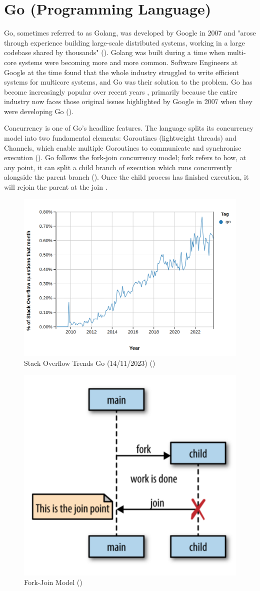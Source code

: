\section{Go (Programming Language)}
\label{litrev:golang}

Go, sometimes referred to as Golang, was developed by Google in 2007 and "arose through experience building large-scale distributed systems, working in a large codebase shared by thousands" (\cite{cox_go_2022}). Golang was built during a time when multi-core systems were becoming more and more common. Software Engineers at Google at the time found that the whole industry struggled to write efficient systems for multicore systems, and Go was their solution to the problem. Go has become increasingly popular over recent years , primarily because the entire industry now faces those original issues highlighted by Google in 2007 when they were developing Go (\cite{cox_go_2022}).

Concurrency is one of Go's headline features. The language splits its concurrency model into two fundamental elements: Goroutines (lightweight threads) and Channels, which enable multiple Goroutines to communicate and synchronise execution (\cite{meyerson_go_2014}). Go follows the fork-join concurrency model; fork refers to how, at any point, it can split a child branch of execution which runs concurrently alongside the parent branch (\cite{cox-buday_concurrency_2017}). Once the child process has finished execution, it will rejoin the parent at the join .

\begin{figure}
    \centering
    \includegraphics[width=0.8\linewidth]{figures/go-so-graph.png}
    \caption{Stack Overflow Trends Go (14/11/2023) (\cite{noauthor_stack_nodate-1})}
    \label{fig:gosograph}
\end{figure}

\begin{figure}
    \centering
    \includegraphics[width=0.5\linewidth]{figures/fork-join.png}
    \caption{Fork-Join Model (\cite{cox-buday_concurrency_2017})}
    \label{fig:forkjoin}
\end{figure}
